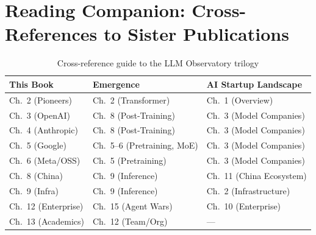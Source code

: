 \section{Reading Companion: Cross-References to Sister Publications}
\label{sec:appendix-xref}

\begin{table}[htbp]
\centering
\caption{Cross-reference guide to the LLM Observatory trilogy}
\label{tab:xref}
\begin{tabularx}{\textwidth}{lXX}
\hline
\textbf{This Book} & \textbf{Emergence} & \textbf{AI Startup Landscape} \\
\hline
\rowcolor{figLightGray}
Ch.\ 2 (Pioneers) & Ch.\ 2 (Transformer) & Ch.\ 1 (Overview) \\
Ch.\ 3 (OpenAI) & Ch.\ 8 (Post-Training) & Ch.\ 3 (Model Companies) \\
\rowcolor{figLightGray}
Ch.\ 4 (Anthropic) & Ch.\ 8 (Post-Training) & Ch.\ 3 (Model Companies) \\
Ch.\ 5 (Google) & Ch.\ 5--6 (Pretraining, MoE) & Ch.\ 3 (Model Companies) \\
\rowcolor{figLightGray}
Ch.\ 6 (Meta/OSS) & Ch.\ 5 (Pretraining) & Ch.\ 3 (Model Companies) \\
Ch.\ 8 (China) & Ch.\ 9 (Inference) & Ch.\ 11 (China Ecosystem) \\
\rowcolor{figLightGray}
Ch.\ 9 (Infra) & Ch.\ 9 (Inference) & Ch.\ 2 (Infrastructure) \\
Ch.\ 12 (Enterprise) & Ch.\ 15 (Agent Wars) & Ch.\ 10 (Enterprise) \\
\rowcolor{figLightGray}
Ch.\ 13 (Academics) & Ch.\ 12 (Team/Org) & --- \\
\hline
\end{tabularx}
\end{table}
